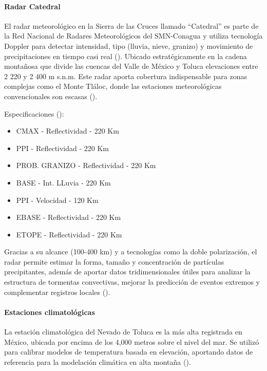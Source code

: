 \paragraph{Radar Catedral} 

El radar meteorológico en la Sierra de las Cruces llamado ``Catedral'' es parte de la Red Nacional de Radares Meteorológicos del SMN-Conagua y utiliza tecnología Doppler para detectar intensidad, tipo (lluvia, nieve, granizo) y movimiento de precipitaciones en tiempo casi real (\cite{ConaguaRadar2025}). Ubicado estratégicamente en la cadena montañosa que divide las cuencas del Valle de México y Toluca  elevaciones entre 2 220 y 2 400 m s.n.m. Este radar aporta cobertura indispensable para zonas complejas como el Monte Tláloc, donde las estaciones meteorológicas convencionales son escasas (\cite{RadarMeteoWiki2025}).

Especificaciones (\cite{smn2025}):
\begin{itemize}
  \item CMAX - Reflectividad - 220 Km
  \item PPI - Reflectividad - 220 Km
  \item PROB. GRANIZO - Reflectividad - 220 Km
  \item BASE - Int. LLuvia - 220 Km
  \item PPI - Velocidad - 120 Km
  \item EBASE - Reflectividad - 220 Km
  \item ETOPE - Reflectividad - 220 Km
\end{itemize}

Gracias a su alcance (100-400 km) y a tecnologías como la doble polarización, el radar permite estimar la forma, tamaño y concentración de partículas precipitantes, además de aportar datos tridimensionales útiles para analizar la estructura de tormentas convectivas, mejorar la predicción de eventos extremos y complementar registros locales (\cite{GarciaPalomo2008}). 



\paragraph{Estaciones climatológicas}


La estación climatológica del Nevado de Toluca es la más alta registrada en México, ubicada por encima de los 4,000 metros sobre el nivel del mar. Se utilizó para calibrar modelos de temperatura basada en elevación, aportando datos de referencia para la modelación climática en alta montaña  (\cite{soto_delgado_2020}).

